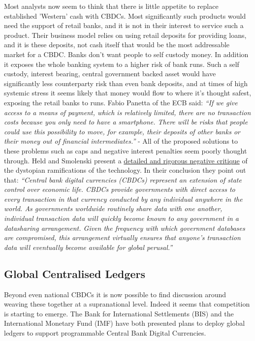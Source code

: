 Most analysts now seem to think that there is little appetite to replace established 'Western' cash with CBDCs. Most significantly such products would need the support of retail banks, and it is not in their interest to service such a product. Their business model relies on using retail deposits for providing loans, and it is these deposits, not cash itself that would be the most addressable market for a CBDC. Banks don't want people to self custody money. In addition it exposes the whole banking system to a higher risk of bank runs. Such a self custody, interest bearing, central government backed asset would have significantly less counterparty risk than even bank deposits, and at times of high systemic stress it seems likely that money would flow to where it's thought safest, exposing the retail banks to runs. Fabio Panetta of the ECB said: \textit{``If we give access to a means of payment, which is relatively limited, there are no transaction costs because you only need to have a smartphone. There will be risks that people could use this possibility to move, for example, their deposits of other banks or their money out of financial intermediates.''} - All of the proposed solutions to these problems such as caps and negative interest penalties seem poorly thought through.
Held and Smolenski present a \href{https://www.btcpolicy.org/articles/why-the-u-s-should-reject-central-bank-digital-currencies}{detailed and rigorous negative critique} of the dystopian ramifications of the technology. In their conclusion they point out that: \textit{``Central bank digital currencies (CBDCs) represent an extension of state control over economic life. CBDCs provide governments with direct access to every transaction in that currency conducted by any individual anywhere in the world. As governments worldwide routinely share data with one another, individual transaction data will quickly become known to any government in a datasharing arrangement. Given the frequency with which government databases are compromised, this arrangement virtually ensures that anyone’s transaction data will eventually become available for global perusal.''}\par

\subsection{Global Centralised Ledgers}

Beyond even national CBDCs it is now possible to find discussion around weaving these together at a supranational level. Indeed it seems that competition is starting to emerge. The Bank for International Settlements (BIS) and the International Monetary Fund (IMF) have both presented plans to deploy global ledgers to support programmable Central Bank Digital Currencies. 
